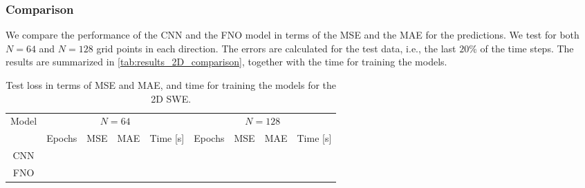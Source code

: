 \subsubsection*{Comparison}
We compare the performance of the CNN and the FNO model in terms of the MSE and the MAE for the predictions.
We test for both $N = 64$ and $N = 128$ grid points in each direction.
The errors are calculated for the test data, i.e., the last $20\%$ of the time steps.
The results are summarized in \autoref{tab:results_2D_comparison}, together with the time for training the models.
\begin{table}[H]
    \centering
    \small %
    \begin{tabular}{c|cccc|cccc}
        Model & \multicolumn{4}{c|}{$N = 64$} & \multicolumn{4}{c}{$N = 128$} \\
        \cline{2-9}
        & Epochs & MSE & MAE & Time [s] & Epochs & MSE & MAE & Time [s] \\
        \hline
        CNN  &
         &
         & 
         &
         &
         &
         &
         &
         
        \\
        \hline
        FNO  &
         &
         &
         &
         &
         &
         &
         &
        
        \\
        \hline
    \end{tabular}
    \caption{Test loss in terms of MSE and MAE, and time for training the models for the 2D SWE.}\label{tab:results_2D_comparison}
\end{table}
